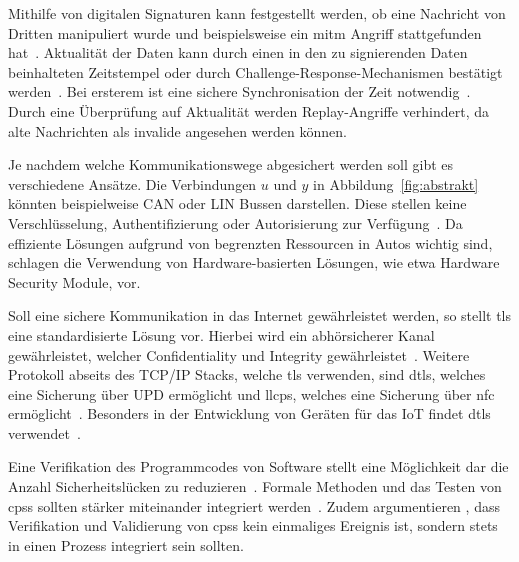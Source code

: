 \documentclass[final,bibliography=totocnumbered]{include/sikseminar}
\newcommand{\cps}{\glspl{cps}\xspace}
\begin{document}
Mithilfe von digitalen Signaturen kann festgestellt werden, ob eine Nachricht von Dritten manipuliert wurde und beispielsweise ein \gls{mitm} Angriff stattgefunden hat~\cite{CAS08}.
Aktualität der Daten kann durch einen in den zu signierenden Daten beinhalteten Zeitstempel oder durch Challenge-Response-Mechanismen bestätigt werden~\cite{CAS08}.
Bei ersterem ist eine sichere Synchronisation der Zeit notwendig~\cite{CAS08}.
Durch eine Überprüfung auf Aktualität werden Replay-Angriffe verhindert, da alte Nachrichten als invalide angesehen werden können.


Je nachdem welche Kommunikationswege abgesichert werden soll gibt es verschiedene Ansätze.
Die Verbindungen $u$ und $y$ in Abbildung~\ref{fig:abstrakt} könnten beispielweise CAN oder LIN Bussen darstellen.
Diese stellen keine Verschlüsselung, Authentifizierung oder Autorisierung zur Verfügung~\cite{HLL+17}.
Da effiziente Lösungen aufgrund von begrenzten Ressourcen in Autos wichtig sind, schlagen \citeauthor{HLL 167,41} die Verwendung von Hardware-basierten Lösungen, wie etwa Hardware Security Module, vor.


Soll eine sichere Kommunikation in das Internet gewährleistet werden, so stellt \gls{tls} eine standardisierte Lösung vor.
Hierbei wird ein abhörsicherer Kanal gewährleistet, welcher Confidentiality und Integrity gewährleistet~\cite{SPB+16}.
Weitere Protokoll abseits des TCP/IP Stacks, welche \gls{tls} verwenden, sind \gls{dtls}, welches eine Sicherung über UPD ermöglicht und \gls{llcps}, welches eine Sicherung über \gls{nfc} ermöglicht~\cite{SPB+16}.
Besonders in der Entwicklung von Geräten für das IoT findet \gls{dtls} verwendet~\cite{YWY+17,FPA+18}.


Eine Verifikation des Programmcodes von Software stellt eine Möglichkeit dar die Anzahl Sicherheitslücken zu reduzieren~\cite{CAS08}.
Formale Methoden und das Testen von \cps sollten stärker miteinander integriert werden~\cite{RLS+10}.
Zudem argumentieren \citeauthor{SGL+08}, dass Verifikation und Validierung von \cps kein einmaliges Ereignis ist, sondern stets in einen Prozess integriert sein sollten.

\end{document}
